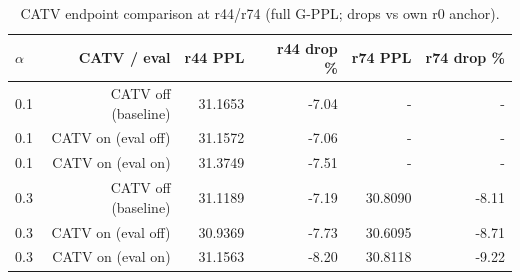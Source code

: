 \begin{table}[t]
\centering
\caption{CATV endpoint comparison at r44/r74 (full G-PPL; drops vs own r0 anchor).}
\label{tab:opt-endpoints}
\begin{tabular}{lrrrrr}
\toprule
$\alpha$ & CATV / eval & r44 PPL & r44 drop \% & r74 PPL & r74 drop \% \\
\midrule
0.1 & CATV off (baseline) & 31.1653 & -7.04 & - & - \\
0.1 & CATV on (eval off) & 31.1572 & -7.06 & - & - \\
0.1 & CATV on (eval on) & 31.3749 & -7.51 & - & - \\
0.3 & CATV off (baseline) & 31.1189 & -7.19 & 30.8090 & -8.11 \\
0.3 & CATV on (eval off) & 30.9369 & -7.73 & 30.6095 & -8.71 \\
0.3 & CATV on (eval on) & 31.1563 & -8.20 & 30.8118 & -9.22 \\
\bottomrule
\end{tabular}
\end{table}
